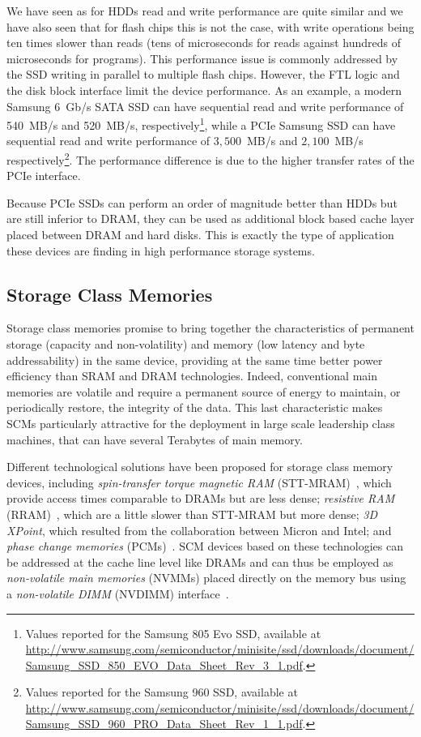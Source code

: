 We have seen as for HDDs read and write performance are quite similar and we have also seen that for flash chips this is not the case, with write operations being ten times slower than reads (tens of microseconds for reads
against hundreds of microseconds for programs). This performance issue is commonly addressed by the SSD writing in parallel to multiple flash chips. However, the FTL logic and the disk block interface limit the device 
performance. As an example, a modern Samsung 6~Gb/s SATA SSD can have sequential read and write performance of 540~MB/s and 520~MB/s, respectively\footnote{Values reported for the Samsung 805 Evo SSD, available at 
\url{http://www.samsung.com/semiconductor/minisite/ssd/downloads/document/Samsung_SSD_850_EVO_Data_Sheet_Rev_3_1.pdf}.}, while a PCIe Samsung SSD can have sequential read and write performance of $3,500$~MB/s and 
$2,100$~MB/s respectively\footnote{Values reported for the Samsung 960 SSD, available at \url{http://www.samsung.com/semiconductor/minisite/ssd/downloads/document/Samsung_SSD_960_PRO_Data_Sheet_Rev_1_1.pdf}.}. The performance
difference is due to the higher transfer rates of the PCIe interface.

Because PCIe SSDs can perform an order of magnitude better than HDDs but are still inferior to DRAM, they can be used as additional block based cache layer placed between DRAM and hard disks. This is exactly the type 
of application these devices are finding in high performance storage systems.

\subsection{Storage Class Memories}
Storage class memories promise to bring together the characteristics of permanent storage (capacity and non-volatility) and memory (low latency and byte addressability) in the same device, providing at the same time better 
power efficiency than SRAM and DRAM technologies. Indeed, conventional main memories are volatile and require a permanent source of energy to maintain, or periodically restore, the integrity of the data. This last 
characteristic makes SCMs particularly attractive for the deployment in large scale leadership class machines, that can have several Terabytes of main memory. 

Different technological solutions have been proposed for storage class memory devices, including \textit{spin-transfer torque magnetic RAM} (STT-MRAM)~\cite{Wang2013}, which provide access times comparable to DRAMs but are
less dense; \textit{resistive RAM} (RRAM)~\cite{Zhang2015}, which are a little slower than STT-MRAM but more dense; \textit{3D XPoint}, which resulted from the collaboration between Micron and Intel; and \textit{phase change 
memories} (PCMs)~\cite{Breitwisch2008}. SCM devices based on these technologies can be addressed at the cache line level like DRAMs and can thus be employed as \textit{non-volatile main memories} (NVMMs) placed directly on 
the memory bus using a \textit{non-volatile DIMM} (NVDIMM) interface~\cite{Lee2009}.

